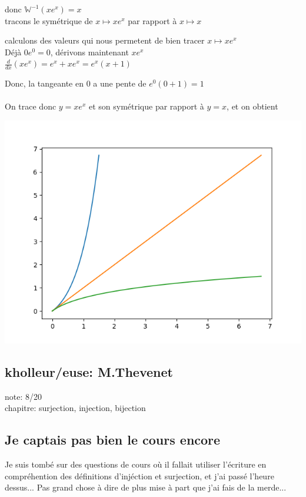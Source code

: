\documentclass{article}
\begin{document}
donc $\mathbb{W}^{-1} (xe^x) = x$ \\
tracons le symétrique de $x \mapsto xe^x$ par rapport à $x \mapsto x$

calculons des valeurs qui nous permetent de bien tracer $x \mapsto xe^x$ \\
Déjà $ 0e^0 = 0$, dérivons maintenant $xe^x$ \\
$\frac{d}{dx}(xe^x) = e^x + xe^x = e^x (x+1)$

Donc, la tangeante en 0 a une pente de $e^0(0+1) = 1$ \\ \\

On trace donc $y = xe^x$ et son symétrique par rapport à $y=x$, et on obtient

\includegraphics[scale=0.5]{assets/maths/graph-kholle-W.png}

\subsection{kholleur/euse: M.Thevenet}

note: 8/20 \\
chapitre: surjection, injection, bijection

\subsection{Je captais pas bien le cours encore}

Je suis tombé sur des questions de cours où il fallait utiliser l'écriture en compréhention des définitions d'injéction et surjection, et j'ai passé l'heure dessus... Pas grand chose à dire de plus mise à part que j'ai fais de la merde... \\
\end{document}
